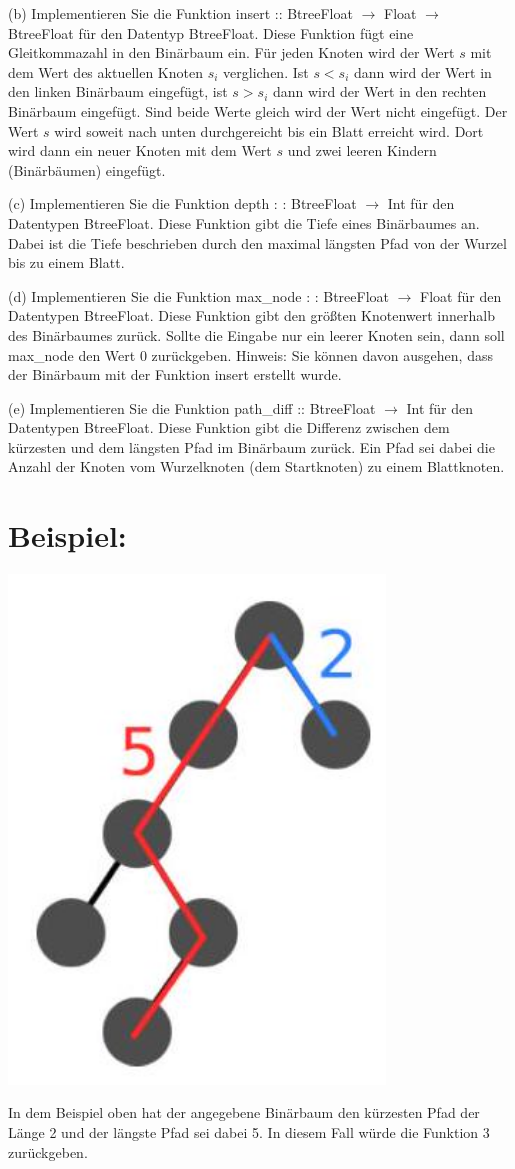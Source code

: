 (b) Implementieren Sie die Funktion insert :: BtreeFloat $\rightarrow$ Float $\rightarrow$ BtreeFloat für den Datentyp BtreeFloat. Diese Funktion fügt eine Gleitkommazahl in den Binärbaum ein. Für jeden Knoten wird der Wert $s$ mit dem Wert des aktuellen Knoten $s_{i}$ verglichen. Ist $s<s_{i}$ dann wird der Wert in den linken Binärbaum eingefügt, ist $s>s_{i}$ dann wird der Wert in den rechten Binärbaum eingefügt. Sind beide Werte gleich wird der Wert nicht eingefügt. Der Wert $s$ wird soweit nach unten durchgereicht bis ein Blatt erreicht wird. Dort wird dann ein neuer Knoten mit dem Wert $s$ und zwei leeren Kindern (Binärbäumen) eingefügt.

(c) Implementieren Sie die Funktion depth : : BtreeFloat $\rightarrow$ Int für den Datentypen BtreeFloat. Diese Funktion gibt die Tiefe eines Binärbaumes an. Dabei ist die Tiefe beschrieben durch den maximal längsten Pfad von der Wurzel bis zu einem Blatt.

(d) Implementieren Sie die Funktion max\_node : : BtreeFloat $\rightarrow$ Float für den Datentypen BtreeFloat. Diese Funktion gibt den größten Knotenwert innerhalb des Binärbaumes zurück. Sollte die Eingabe nur ein leerer Knoten sein, dann soll max\_node den Wert 0 zurückgeben. Hinweis: Sie können davon ausgehen, dass der Binärbaum mit der Funktion insert erstellt wurde.

(e) Implementieren Sie die Funktion path\_diff :: BtreeFloat $\rightarrow$ Int für den Datentypen BtreeFloat. Diese Funktion gibt die Differenz zwischen dem kürzesten und dem längsten Pfad im Binärbaum zurück. Ein Pfad sei dabei die Anzahl der Knoten vom Wurzelknoten (dem Startknoten) zu einem Blattknoten.

\section{Beispiel:}
\includegraphics[width=10cm]{2022_11_23_3d3b162f8463b52386b8g-3}

In dem Beispiel oben hat der angegebene Binärbaum den kürzesten Pfad der Länge 2 und der längste Pfad sei dabei 5. In diesem Fall würde die Funktion 3 zurückgeben.
